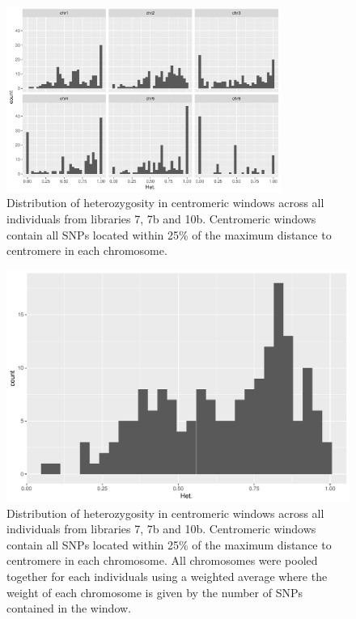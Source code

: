 \documentclass[10pt,a4paper]{report}
\begin{document}
\begin{figure}[h]
	\begin{center}
		\includegraphics[width=0.8\textwidth]{Num_CSD_loci/Hist_25cen_het_chr.pdf}
		\caption{Distribution of heterozygosity in centromeric windows across all individuals from libraries 7, 7b and 10b. Centromeric windows contain all SNPs located within 25\% of the maximum distance to centromere in each chromosome.}
		\label{dist_het_25cen_chr}
	\end{center}
\end{figure}

\begin{figure}[h]
	\begin{center}
		\includegraphics[width=\textwidth]{Num_CSD_loci/Hist_25cen_het.pdf}
		\caption{Distribution of heterozygosity in centromeric windows across all individuals from libraries 7, 7b and 10b. Centromeric windows contain all SNPs located within 25\% of the maximum distance to centromere in each chromosome. All chromosomes were pooled together for each individuals using a weighted average where the weight of each chromosome is given by the number of SNPs contained in the window.}
		\label{dist_het_25cen}
	\end{center}
\end{figure}
\FloatBarrier
\end{document}
